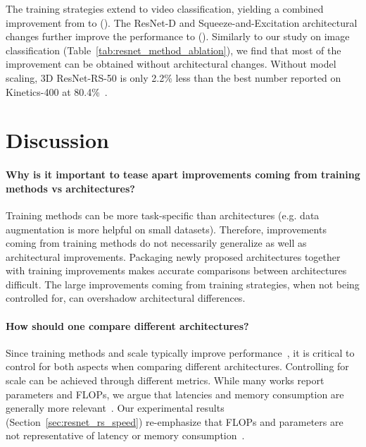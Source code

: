 \documentclass{article}
\begin{document}
The training strategies extend to video classification, yielding a combined improvement from  to  ().
The ResNet-D and Squeeze-and-Excitation architectural changes further improve the performance to  ().
Similarly to our study on image classification (Table~\ref{tab:resnet_method_ablation}), we find that most of the improvement can be obtained without architectural changes.
Without model scaling, 3D ResNet-RS-50 is only 2.2\% less than the best number reported on Kinetics-400 at 80.4\%~\cite{Feichtenhofer2020X3DEA}. \section{Discussion\label{sec:discussion}}

\paragraph{Why is it important to tease apart improvements coming from training methods vs architectures?}
Training methods can be more task-specific than architectures (e.g. data augmentation is more helpful on small datasets).
Therefore, improvements coming from training methods do not necessarily generalize as well as architectural improvements.
Packaging newly proposed architectures together with training improvements makes accurate comparisons between architectures difficult.
The large improvements coming from training strategies, when not being controlled for, can overshadow architectural differences.

\vspace{-0.25cm}
\paragraph{How should one compare different architectures?}
Since training methods and scale typically improve performance~\cite{lee2020compounding,kaplan2020scaling}, it is critical to control for both aspects when comparing different architectures.
Controlling for scale can be achieved through different metrics.
While many works report parameters and FLOPs, we argue that latencies and memory consumption are generally more relevant~\cite{radosavovic2020designing}.
Our experimental results (Section~\ref{sec:resnet_rs_speed}) re-emphasize that FLOPs and parameters are not representative of latency or memory consumption~\cite{radosavovic2020designing,norrie2021design}.

\vspace{-0.25cm}
\end{document}
